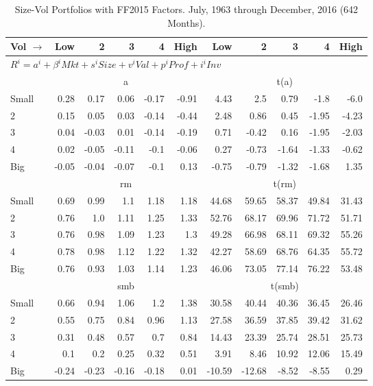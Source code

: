 
\begin{table}[!ht]
\centering
\caption{Size-Vol Portfolios with FF2015 Factors. \footnotesize{July, 1963 through December, 2016 (642 Months).}}
\begin{tabular}{lrrrrrrrrrr}
  \toprule
  Vol $\rightarrow$ & Low & 2 & 3 & 4 & High & Low & 2 & 3 & 4 & High \\ 
  \toprule
  \multicolumn{9}{l}{$R^i=a^i+\beta^iMkt+s^iSize+v^iVal+p^iProf+i^iInv$} \\

  

      & \multicolumn{5}{c}{a} & \multicolumn{5}{c}{t(a)} \\
    \cmidrule(r){2-6} \cmidrule(r){7-11}
      Small  & 0.28  & 0.17  & 0.06  & -0.17  & -0.91   & 4.43  & 2.5  & 0.79  & -1.8  & -6.0  \\
          2  & 0.15  & 0.05  & 0.03  & -0.14  & -0.44   & 2.48  & 0.86  & 0.45  & -1.95  & -4.23  \\
          3  & 0.04  & -0.03  & 0.01  & -0.14  & -0.19   & 0.71  & -0.42  & 0.16  & -1.95  & -2.03  \\
          4  & 0.02  & -0.05  & -0.11  & -0.1  & -0.06   & 0.27  & -0.73  & -1.64  & -1.33  & -0.62  \\
      Big    & -0.05  & -0.04  & -0.07  & -0.1  & 0.13   & -0.75  & -0.79  & -1.32  & -1.68  & 1.35  \\

  

      & \multicolumn{5}{c}{rm} & \multicolumn{5}{c}{t(rm)} \\
    \cmidrule(r){2-6} \cmidrule(r){7-11}
      Small  & 0.69  & 0.99  & 1.1  & 1.18  & 1.18   & 44.68  & 59.65  & 58.37  & 49.84  & 31.43  \\
          2  & 0.76  & 1.0  & 1.11  & 1.25  & 1.33   & 52.76  & 68.17  & 69.96  & 71.72  & 51.71  \\
          3  & 0.76  & 0.98  & 1.09  & 1.23  & 1.3   & 49.28  & 66.98  & 68.11  & 69.32  & 55.26  \\
          4  & 0.78  & 0.98  & 1.12  & 1.22  & 1.32   & 42.27  & 58.69  & 68.76  & 64.35  & 55.72  \\
      Big    & 0.76  & 0.93  & 1.03  & 1.14  & 1.23   & 46.06  & 73.05  & 77.14  & 76.22  & 53.48  \\

  

      & \multicolumn{5}{c}{smb} & \multicolumn{5}{c}{t(smb)} \\
    \cmidrule(r){2-6} \cmidrule(r){7-11}
      Small  & 0.66  & 0.94  & 1.06  & 1.2  & 1.38   & 30.58  & 40.44  & 40.36  & 36.45  & 26.46  \\
          2  & 0.55  & 0.75  & 0.84  & 0.96  & 1.13   & 27.58  & 36.59  & 37.85  & 39.42  & 31.62  \\
          3  & 0.31  & 0.48  & 0.57  & 0.7  & 0.84   & 14.43  & 23.39  & 25.74  & 28.51  & 25.73  \\
          4  & 0.1  & 0.2  & 0.25  & 0.32  & 0.51   & 3.91  & 8.46  & 10.92  & 12.06  & 15.49  \\
      Big    & -0.24  & -0.23  & -0.16  & -0.18  & 0.01   & -10.59  & -12.68  & -8.52  & -8.55  & 0.29  \\


\end{tabular}
\end{table}
